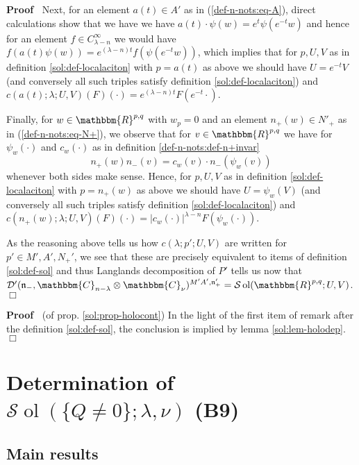 \documentclass[12pt]{article}
\newcommand{\tmop}[1]{\ensuremath{\operatorname{#1}}}
\renewenvironment{proof}{\noindent\textbf{Proof\ }}{\hspace*{\fill}$\Box$\medskip}
\theoremstyle{remark}
\begin{document}
\begin{proof}
  Next, for an element $a (t) \in A'$ as in (\ref{def-n-nots:eq-A}), direct
  calculations show that we have we have $a (t) \cdot \psi (w) = e^t \psi
  (e^{- t} w)$ and hence for an element $f \in C^{\infty}_{\lambda - n}$ we
  would have $f (a (t) \psi (w)) = e^{(\lambda - n) t} f (\psi (e^{- t} w))$,
  which implies that for $p, U, V$ as in definition \ref{sol:def-localaciton}
  with $p = a (t)$ as above we should have $U = e^{- t} V$ (and conversely all
  such triples satisfy definition \ref{sol:def-localaciton}) and $c (a (t) ;
  \lambda ; U, V) (F) (\cdot) = e^{(\lambda - n) t} F (e^{- t} \cdot)$.
  
  Finally, for $w \in \mathbbm{R}^{p, q}$ with $w_p = 0$ and an element $n_+
  (w) \in N'_+$ as in (\ref{def-n-nots:eq-N+}), we observe that for $v \in
  \mathbbm{R}^{p, q}$ we have for $\psi_w (\cdot)$ and $c_w (\cdot)$ as in
  definition \ref{def-n-nots:def-n+invar}
  \[ n_+ (w) n_- (v) = c_w (v) \cdot n_- (\psi_w (v)) \]
  whenever both sides make sense. Hence, for $p, U, V$ as in definition
  \ref{sol:def-localaciton} with $p = n_+ (w)$ as above we should have $U =
  \psi_w (V)$ (and conversely all such triples satisfy definition
  \ref{sol:def-localaciton}) and $c (n_+ (w) ; \lambda ; U, V) (F) (\cdot) = |
  c_w (\cdot) |^{\lambda - n} F (\psi_w (\cdot))$.
  
  As the reasoning above tells us how $c (\lambda ; p' ; U, V)$ are written
  for $p' \in M', A', N_+'$, we see that these are precisely equivalent to
  items of definition \ref{sol:def-sol} and thus Langlands decomposition of
  $P'$ tells us now that $\mathcal{D}' (\mathfrak{n}_-, \mathbbm{C}_{n -
  \lambda} \otimes \mathbbm{C}_{\nu})^{M' A', \mathfrak{n}'_+} =\mathcal{S}
  \tmop{ol} (\mathbbm{R}^{p, q} ; U, V)$.
\end{proof}

\begin{proof}
  (of prop. \ref{sol:prop-holocont}) In the light of the first item of remark
  after the definition \ref{sol:def-sol}, the conclusion is implied by lemma
  \ref{sol:lem-holodep}.
\end{proof}

\section{Determination of $\mathcal{S} \tmop{ol} (\{ Q \neq 0 \} ; \lambda,\nu)$ (B9)}\label{sec:lem67}


\subsection{Main results}
\end{document}
